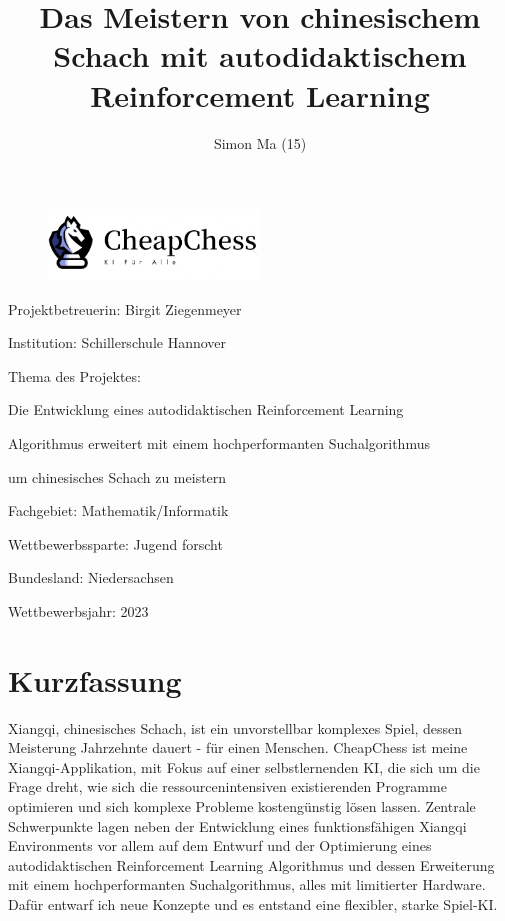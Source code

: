 \documentclass{jpp}
\title{Das Meistern von chinesischem Schach mit autodidaktischem Reinforcement Learning}
\author{Simon Ma (15)\aff{1}
  \corresp{\email{simon.mama07@gmail.com}}
  }
\affiliation{\aff{1}Schillerschule Hannover,
Ebellstr. 15, 30629 Hannover, Germany}
\begin{document}
\begin{figure}
\centering
\includegraphics[width={0.5\textwidth}]{imgs/loogo.png}
\end{figure}
\maketitle


Projektbetreuerin: Birgit Ziegenmeyer

Institution: Schillerschule Hannover

Thema des Projektes:

Die Entwicklung eines autodidaktischen Reinforcement Learning 

Algorithmus erweitert mit einem hochperformanten Suchalgorithmus 

um chinesisches Schach zu meistern

Fachgebiet: Mathematik/Informatik

Wettbewerbssparte: Jugend forscht

Bundesland: Niedersachsen

Wettbewerbsjahr: 2023

\newpage

\tableofcontents

\newpage

\section{Kurzfassung}
Xiangqi, chinesisches Schach, ist ein unvorstellbar komplexes Spiel, dessen Meisterung Jahrzehnte dauert - für einen Menschen. CheapChess ist meine Xiangqi-Applikation, mit Fokus auf einer selbstlernenden KI, die sich um die Frage dreht, wie sich die ressourcenintensiven existierenden Programme optimieren und sich komplexe Probleme kostengünstig lösen lassen. Zentrale Schwerpunkte lagen neben der Entwicklung eines funktionsfähigen Xiangqi Environments vor allem auf dem Entwurf und der Optimierung eines autodidaktischen Reinforcement Learning Algorithmus und dessen Erweiterung mit einem hochperformanten Suchalgorithmus, alles mit limitierter Hardware. Dafür entwarf ich neue Konzepte und es entstand eine flexibler, starke Spiel-KI.
\end{document}
